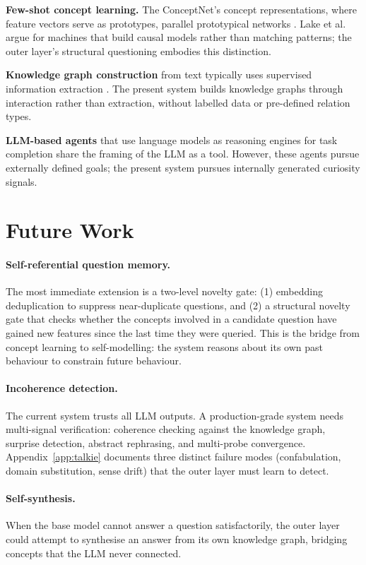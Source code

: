 \documentclass[conference]{IEEEtran}
\begin{document}
\textbf{Few-shot concept learning.} The ConceptNet's concept representations, where feature vectors serve as prototypes, parallel prototypical networks \cite{snell2017}. Lake et al.\ \cite{lake2017} argue for machines that build causal models rather than matching patterns; the outer layer's structural questioning embodies this distinction.

\textbf{Knowledge graph construction} from text typically uses supervised information extraction \cite{ji2022}. The present system builds knowledge graphs through interaction rather than extraction, without labelled data or pre-defined relation types.

\textbf{LLM-based agents} that use language models as reasoning engines for task completion \cite{yao2023} share the framing of the LLM as a tool. However, these agents pursue externally defined goals; the present system pursues internally generated curiosity signals.


\section{Future Work}
\label{sec:future}

\paragraph{Self-referential question memory.} The most immediate extension is a two-level novelty gate: (1) embedding deduplication to suppress near-duplicate questions, and (2) a structural novelty gate that checks whether the concepts involved in a candidate question have gained new features since the last time they were queried. This is the bridge from concept learning to self-modelling: the system reasons about its own past behaviour to constrain future behaviour.

\paragraph{Incoherence detection.} The current system trusts all LLM outputs. A production-grade system needs multi-signal verification: coherence checking against the knowledge graph, surprise detection, abstract rephrasing, and multi-probe convergence. Appendix~\ref{app:talkie} documents three distinct failure modes (confabulation, domain substitution, sense drift) that the outer layer must learn to detect.

\paragraph{Self-synthesis.} When the base model cannot answer a question satisfactorily, the outer layer could attempt to synthesise an answer from its own knowledge graph, bridging concepts that the LLM never connected.
\end{document}
